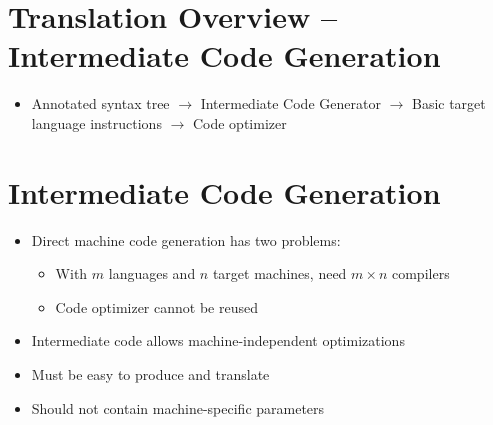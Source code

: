 \documentclass[a4paper,12pt]{article}
\begin{document}
\section{Translation Overview – Intermediate Code Generation}
\begin{itemize}[leftmargin=1.5em]
    \item Annotated syntax tree $\rightarrow$ Intermediate Code Generator $\rightarrow$ Basic target language instructions $\rightarrow$ Code optimizer
\end{itemize}

\section{Intermediate Code Generation}
\begin{itemize}[leftmargin=1.5em]
    \item Direct machine code generation has two problems:
    \begin{itemize}
        \item With $m$ languages and $n$ target machines, need $m \times n$ compilers
        \item Code optimizer cannot be reused
    \end{itemize}
    \item Intermediate code allows machine-independent optimizations
    \item Must be easy to produce and translate
    \item Should not contain machine-specific parameters
\end{itemize}
\end{document}
